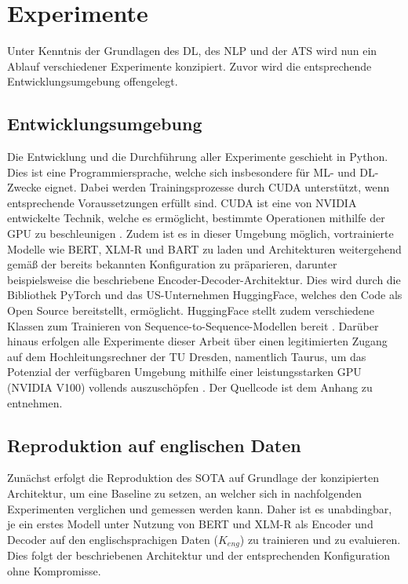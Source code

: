 \chapter{Experimente}
\thispagestyle{fancy}
\label{chap:Experimente}

\noindent
Unter Kenntnis der Grundlagen des \ac{DL}, des \ac{NLP} und der \ac{ATS} wird nun ein Ablauf verschiedener Experimente konzipiert. Zuvor wird die entsprechende Entwicklungsumgebung offengelegt.


\section{Entwicklungsumgebung}
\noindent
Die Entwicklung und die Durchführung aller Experimente geschieht in Python. Dies ist eine Programmiersprache, welche sich insbesondere für \ac{ML}- und \ac{DL}-Zwecke eignet. Dabei werden Trainingsprozesse durch \ac{CUDA} unterstützt, wenn entsprechende Voraussetzungen erfüllt sind. \ac{CUDA} ist eine von NVIDIA entwickelte Technik, welche es ermöglicht, bestimmte Operationen mithilfe der GPU zu beschleunigen \cite{NVI21}. Zudem ist es in dieser Umgebung möglich, vortrainierte Modelle wie \ac{BERT}, {XLM-R} und \ac{BART} zu laden und Architekturen weitergehend gemäß der bereits bekannten Konfiguration zu präparieren, darunter beispielsweise die beschriebene Encoder-Decoder-Architektur. Dies wird durch die Bibliothek PyTorch und das US-Unternehmen HuggingFace, welches den Code als Open Source bereitstellt, ermöglicht. HuggingFace stellt zudem verschiedene Klassen zum Trainieren von Sequence-to-Sequence-Modellen bereit \cite{HUG21}. Darüber hinaus erfolgen alle Experimente dieser Arbeit über einen legitimierten Zugang auf dem Hochleitungsrechner der TU Dresden, namentlich Taurus, um das Potenzial der verfügbaren Umgebung mithilfe einer leistungsstarken GPU (NVIDIA V100) vollends auszuschöpfen \cite{ZIH21}. Der Quellcode ist dem Anhang zu entnehmen.
\newpage


\section{Reproduktion auf englischen Daten}
\noindent
Zunächst erfolgt die Reproduktion des \ac{SOTA} auf Grundlage der konzipierten Architektur, um eine Baseline zu setzen, an welcher sich in nachfolgenden Experimenten verglichen und gemessen werden kann. Daher ist es unabdingbar, je ein erstes Modell unter Nutzung von \ac{BERT} und {XLM-R} als Encoder und Decoder auf den englischsprachigen Daten ($K_{eng}$) zu trainieren und zu evaluieren. Dies folgt der beschriebenen Architektur und der entsprechenden Konfiguration ohne Kompromisse.


